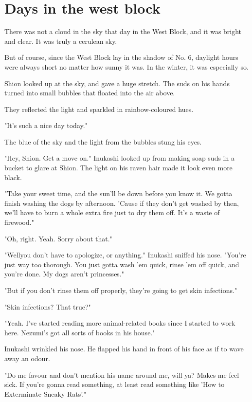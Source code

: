 
\chapter{Days in the west block}

There was not a cloud in the sky that day in the West Block, and it was
bright and clear. It was truly a cerulean sky.

But of course, since the West Block lay in the shadow of No. 6, daylight
hours were always short no matter how sunny it was. In the winter, it
was especially so.

Shion looked up at the sky, and gave a huge stretch. The suds on his
hands turned into small bubbles that floated into the air above.

They reflected the light and sparkled in rainbow-coloured hues.

"It's such a nice day today."

The blue of the sky and the light from the bubbles stung his eyes.

"Hey, Shion. Get a move on." Inukashi looked up from making soap suds in
a bucket to glare at Shion. The light on his raven hair made it look
even more black.

"Take your sweet time, and the sun'll be down before you know it. We
gotta finish washing the dogs by afternoon. 'Cause if they don't get
washed by then, we'll have to burn a whole extra fire just to dry them
off. It's a waste of firewood."

"Oh, right. Yeah. Sorry about that."

"Well\el you don't have to apologize, or anything." Inukashi sniffed his
nose. "You're just way too thorough. You just gotta wash 'em quick,
rinse 'em off quick, and you're done. My dogs aren't princesses."

"But if you don't rinse them off properly, they're going to get skin
infections."

"Skin infections? That true?"

"Yeah. I've started reading more animal-related books since I started to
work here. Nezumi's got all sorts of books in his house."

Inukashi wrinkled his nose. He flapped his hand in front of his face as
if to wave away an odour.

"Do me favour and don't mention his name around me, will ya? Makes me
feel sick. If you're gonna read something, at least read something like
'How to Exterminate Sneaky Rats'."

